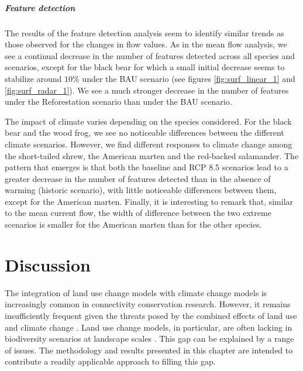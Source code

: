 \vspace{1em}

\subparagraph*{\textit{Feature detection}} The results of the feature detection analysis seem to identify similar trends as those observed for the changes in flow values. As in the mean flow analysis, we see a continual decrease in the number of features detected across all species and scenarios, except for the black bear for which a small initial decrease seems to stabilize around $10\%$ under the BAU scenario (see figures \ref{fig:surf_linear_1} and \ref{fig:surf_radar_1}). We see a much stronger decrease in the number of features under the Reforestation scenario than under the BAU scenario.

The impact of climate varies depending on the species considered. For the black bear and the wood frog, we see no noticeable differences between the different climate scenarios. However, we find different responses to climate change among the short-tailed shrew, the American marten and the red-backed salamander. The pattern that emerges is that both the baseline and RCP 8.5 scenarios lead to a greater decrease in the number of features detected than in the absence of warming (historic scenario), with little noticeable differences between them, except for the American marten. Finally, it is interesting to remark that, similar to the mean  current flow, the width of difference between the two extreme scenarios is smaller for the American marten than for the other species.\\

\section{Discussion}

The integration of land use change models with climate change models is increasingly common in connectivity conservation research. However, it remains insufficiently frequent given the threats posed by the combined effects of land use and climate change \citep{costanza_landscape_2019}. Land use change models, in particular, are often lacking in biodiversity scenarios at landscape scales \citep{titeux_biodiversity_2016}. This gap can be explained by a range of issues. The methodology and results presented in this chapter are intended to contribute a readily applicable approach to filling this gap.

